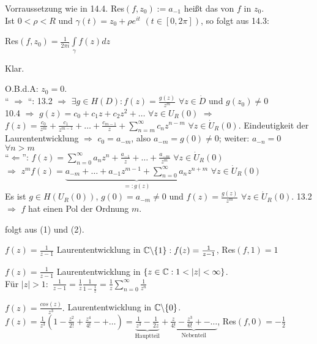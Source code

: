 \documentclass[a4paper,twoside,DIV15,BCOR12mm]{scrbook}
\begin{document}
\begin{definition}
Vorraussetzung wie in 14.4. Res$(f, z_0) := a_{-1}$ heißt das 
von $f$ in $z_0$. \\
Ist $0 < \rho < R$ und $\gamma(t) = z_0 + \rho e ^{it}$ $( t \in [0, 2 \pi])$,
so folgt aus 14.3: \\ \centerline{Res$(f, z_0) = \frac{1}{2\pi i} \int\limits_{\gamma} f(z)
dz$}
\end{definition}

\begin{beweis}
\begin{liste}
\item Klar.
\item O.B.d.A: $z_0 = 0$. \\
`` $\Rightarrow$ ``: 13.2 $\Rightarrow$ $\exists g \in H(D): f(z) =
\frac{g(z)}{z^m}$ $\forall z \in \dot{D}$ und $g(z_0) \neq 0$  \\
10.4 $\Rightarrow$ $g(z) = c_0 + c_1z + c_2 z^2 + \ldots $ $\forall z \in
U_R(0)$ $\Rightarrow$ $f(z) = \frac{c_0}{z^m}  + \frac{c_1}{z^{m-1}} + \ldots +
\frac{c_{m-1}}{z} + \sum\limits_{n=m}^{\infty} c_n z^{n-m}$ $\forall z \in
\dot{U}_R(0)$. Eindeutigkeit der Laurententwicklung $\Rightarrow$ $c_0 =
a_{-m}$, also $a_{-m} = g(0) \neq 0$; weiter: $a_{-n} = 0$ $\forall n > m$ \\
``$\Leftarrow$'': $f(z) = \sum\limits_{n=0}^{\infty} a_n z^n + \frac{a_{-1}}{z}
+ \ldots + \frac{a_{-m}}{z^m}$ $\forall z \in \dot{U}_R(0)$ \\
$\Rightarrow$ $z^m f(z) = \underbrace{a_{-m} + \ldots + a_{-1} z ^{m-1} +
\sum\limits_{n=0}^{\infty} a_n z^{n+m}}_{ =: g(z)}$ $\forall z \in \dot{U}_R(0)$
\\
Es ist $g \in H(U_R(0))$, $g(0) = a_{-m} \neq 0$ und $f(z) = \frac{g(z)}{z^m}$
$\forall z \in \dot{U}_R(0)$. 13.2 $\Rightarrow$ $f$ hat einen Pol der Ordnung $m$.
\item folgt aus (1) und (2).
\end{liste}
\end{beweis}

\begin{beispiele}
\begin{liste}
\item $f(z) = \frac{1}{z-1}$ Laurententwicklung in $\mathbb{C} \backslash \{1\}: f(z)
= \frac{1}{z-1}$, Res$(f,1) = 1$
\item  $f(z) = \frac{1}{z-1}$ Laurententwicklung in $\{ z \in \mathbb{C} : 1 < |z| <
\infty \}$.\\ Für $|z| >
1: $ $\frac{1}{z-1} = \frac{1}{z} \frac{1}{1- \frac{1}{z}} = 
\frac{1}{z} \sum\limits_{n=0}^{\infty} \frac{1}{z^n}$
\item $f(z) = \frac{cos(z)}{z^3}.$ Laurententwicklung in $\mathbb{C} \backslash
\{0\}$. $f(z) = \frac{1}{z^3}(1 - \frac{z^2}{2!} + \frac{z^4}{4!} -+ \ldots)
= \underbrace{\frac{1}{z^3} - \frac{1}{2z}}_{\text{Hauptteil}} + \underbrace{\frac{z}{4!}-
\frac{z^3}{6!} +- \ldots}_{\text{Nebenteil}}$, Res$(f,0) = -\frac{1}{2}$
\end{liste}
\end{beispiele}
\end{document}
